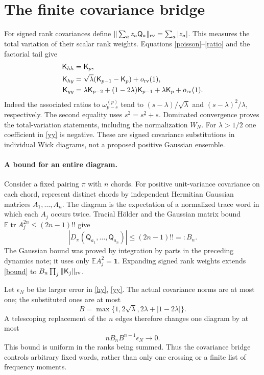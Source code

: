 \documentclass[11pt,a4paper]{article}
\newcommand{\E}{\mathbb E}
\newcommand{\tr}{\operatorname{tr}}
\newcommand{\K}{\mathsf K}
\begin{document}
\newpage
\section{The finite covariance bridge}
For signed rank covariances define
$\|\sum_a z_a\mathsf Q_a\|_{\rm rv}=\sum_a|z_a|$.
This measures the total variation of their scalar rank weights.
Equations \eqref{poisson}--\eqref{ratio} and the factorial tail give
\begin{align}
 \K_{hh}&=\K_p,\nonumber\\
 \K_{hy}&=\sqrt\lambda(\K_{p-1}-\K_p)+o_{\rm rv}(1),
                                                               \label{hy}\\
 \K_{yy}&=\lambda\K_{p-2}+(1-2\lambda)\K_{p-1}
                         +\lambda\K_p+o_{\rm rv}(1).            \label{yy}
\end{align}
Indeed the associated ratios to $\omega_{p-s}^{(p)}$ tend to
$(s-\lambda)/\sqrt\lambda$ and $(s-\lambda)^2/\lambda$,
respectively. The second equality uses
$s^2=s^{\underline2}+s$. Dominated convergence proves the
total-variation statements, including the normalization $W_N$.
For $\lambda>1/2$ one coefficient in \eqref{yy} is negative.
These are signed covariance substitutions in individual Wick
diagrams, not a proposed positive Gaussian ensemble.

\paragraph{A bound for an entire diagram.}
Consider a fixed pairing $\pi$ with $n$ chords. For positive
unit-variance covariance on each chord, represent distinct
chords by independent Hermitian Gaussian matrices $A_1,\ldots,A_n$.
The diagram is the expectation of a normalized trace word in
which each $A_j$ occurs twice. Tracial H\"older and the Gaussian
matrix bound $\E\tr A_j^{2n}\leq(2n-1)!!$ give
\begin{equation}
 |D_\pi(\mathsf Q_{a_1},\ldots,\mathsf Q_{a_n})|
 \leq (2n-1)!!=:B_n.                          \label{bound}
\end{equation}
The Gaussian bound was proved by integration by parts in the
preceding dynamics note; it uses only $\E A_j^2=\mathbf1$.
Expanding signed rank weights extends \eqref{bound} to
$B_n\prod_j\|\K_j\|_{\rm rv}$.

Let $\epsilon_N$ be the larger error in \eqref{hy}, \eqref{yy}.
The actual covariance norms are at most one; the substituted
ones are at most
\[
 B=\max\{1,2\sqrt\lambda,2\lambda+|1-2\lambda|\}.
\]
A telescoping replacement of the $n$ edges therefore changes
one diagram by at most
\begin{equation}
 n B_n B^{n-1}\epsilon_N\longrightarrow0.       \label{error}
\end{equation}
This bound is uniform in the ranks being summed. Thus the
covariance bridge controls arbitrary fixed words, rather than
only one crossing or a finite list of frequency moments.
\end{document}
